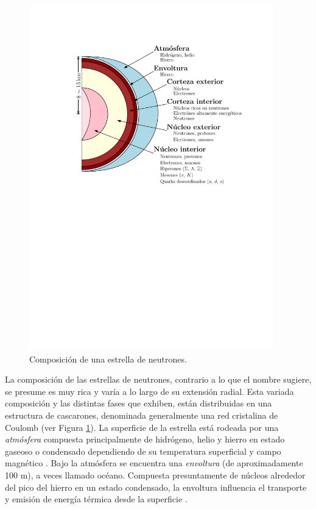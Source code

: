 \begin{figure}[H]
    \centering
    \includegraphics[width=300pt]{figures/neutronstar.pdf}
    \caption[Composición de una estrella de neutrones]{Composición de una estrella de neutrones.\protect\footnotemark}
    \label{NSC}
\end{figure}



\noindent La composición de las estrellas de neutrones, contrario a lo que el nombre sugiere, se presume es muy rica y varía a lo largo de su extensión radial. Esta variada composición y las distintas fases que exhiben, están distribuidas en una estructura de cascarones, denominada generalmente una red cristalina de Coulomb (ver Figura \ref{NSC}).
La superficie de la estrella está rodeada por una \emph{atmósfera} compuesta principalmente de hidrógeno, helio y hierro en estado gaseoso o condensado dependiendo de su temperatura superficial y campo magnético \cite{Zavlin2002}. %
Bajo la atmósfera se encuentra una \emph{envoltura} (de aproximadamente 100 \si{\metre}), a veces llamado océano. Compuesta presuntamente de núcleos alrededor del pico del hierro en un estado condensado, la envoltura influencia el transporte y emisión de energía térmica desde la superficie \cite{Piekarewicz2013,Potekhin2010,Lattimer2004}.

